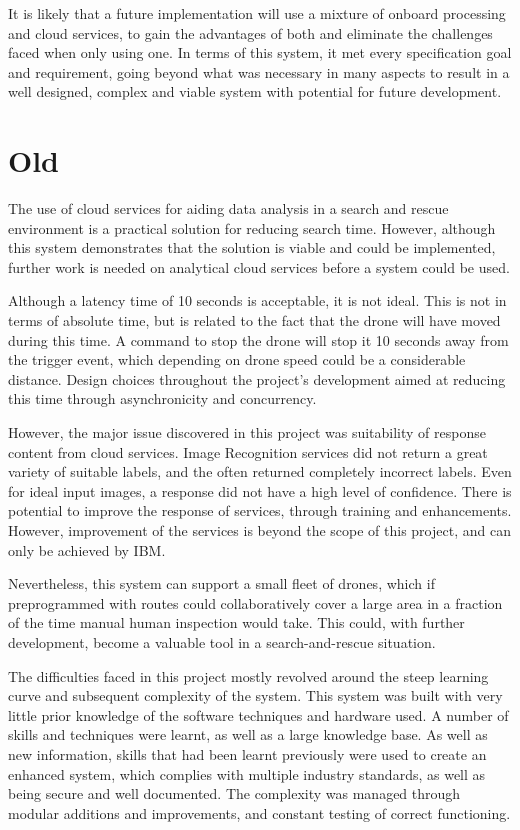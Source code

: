 \documentclass{article}
\begin{document}
It is likely that a future implementation will use a mixture of onboard processing and cloud services, to gain the advantages of both and eliminate the challenges faced when only using one. In terms of this system, it met every specification goal and requirement, going beyond what was necessary in many aspects to result in a well designed, complex and viable system with potential for future development.






\section{Old}

The use of cloud services for aiding data analysis in a search and rescue environment is a practical solution for reducing search time. However, although this system demonstrates that the solution is viable and could be implemented, further work is needed on analytical cloud services before a system could be used. 

Although a latency time of 10 seconds is acceptable, it is not ideal. This is not in terms of absolute time, but is related to the fact that the drone will have moved during this time. A command to stop the drone will stop it 10 seconds away from the trigger event, which depending on drone speed could be a considerable distance. Design choices throughout the project's development aimed at reducing this time through asynchronicity and concurrency.

However, the major issue discovered in this project was suitability of response content from cloud services. Image Recognition services did not return a great variety of suitable labels, and the often returned completely incorrect labels. Even for ideal input images, a response did not have a high level of confidence. There is potential to improve the response of services, through training and enhancements. However, improvement of the services is beyond the scope of this project, and can only be achieved by IBM. 

Nevertheless, this system can support a small fleet of drones, which if preprogrammed with routes could collaboratively cover a large area in a fraction of the time manual human inspection would take. This could, with further development, become a valuable tool in a search-and-rescue situation. 

The difficulties faced in this project mostly revolved around the steep learning curve and subsequent complexity of the system. This system was built with very little prior knowledge of the software techniques and hardware used. A number of skills and techniques were learnt, as well as a large knowledge base. As well as new information, skills that had been learnt previously were used to create an enhanced system, which complies with multiple industry standards, as well as being secure and well documented. The complexity was managed through modular additions and improvements, and constant testing of correct functioning.
\end{document}
